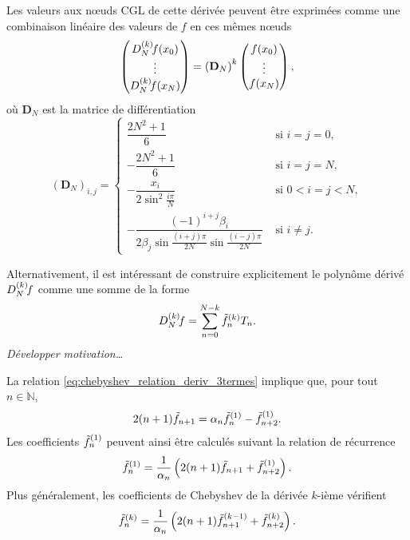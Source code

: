 Les valeurs aux n\oe uds CGL de cette dérivée peuvent être exprimées comme une combinaison linéaire des valeurs de $f$ en ces mêmes n\oe uds
\begin{equation}
	\colvec{ 
		\interpderiv{f}{N}{k}(x_0) \\ 
		\vdots \\
		\interpderiv{f}{N}{k}(x_N)
		}
	=
	{\left( \mathbf{D}_N \right)}^k
	\colvec{ 
		f(x_0) \\ 
		\vdots \\
		f(x_N)
		},
	\label{eq:chebyshev_diff_at_cgl}
\end{equation}
où $\mathbf{D}_N$ est la matrice de différentiation \cite{canuto2006}
\def\cvsp{2.5ex}
\begin{equation}
	\left( \mathbf{D}_N \right)_{i,j} =
	\begin{cases}
	 \dfrac{2N^2 + 1}{6} & \text{\ si\ } i = j = 0,   \\[\cvsp]
	 -\dfrac{2N^2 + 1}{6} & \text{\ si\ } i = j = N,   \\[\cvsp]
	 -\dfrac{x_i}{2 \sin^2 \frac{i \pi}{N}} & \text{\ si\ } 0 < i = j < N, \\[\cvsp]
	 -\dfrac{(-1)^{i+j} \beta_i}{2 \beta_j \sin\frac{(i+j)\pi}{2N} \sin\frac{(i-j)\pi}{2N}} & \text{\ si\ } i \neq j.
	\end{cases}
	\label{eq:chebyshev_diff_matrix}
\end{equation}

Alternativement, il est intéressant de construire explicitement le polynôme dérivé $\interpderiv{f}{N}{k}$ comme une somme de la forme 
\begin{equation}
	\interpderiv{f}{N}{k} = \sum_{n=0}^{N-k} \deriv{\tilde{f}}{k}_n T_n.
\end{equation} 
\textit{Développer motivation\ldots}

\par
La relation \eqref{eq:chebyshev_relation_deriv_3termes} implique que, pour tout $n \in \mathbb{N}$,
\begin{equation}
	2 (n + 1) \tilde{f}_{n+1} = \alpha_n \deriv{\tilde{f}}{1}_n - \deriv{\tilde{f}}{1}_{n+2}.
	\label{eq:chebyshev_prim_recurrence}
\end{equation}
Les coefficients $\deriv{\tilde{f}}{1}_n$ peuvent ainsi être calculés suivant la relation de récurrence
\begin{equation}
	\deriv{\tilde{f}}{1}_n = 
	\frac{1}{\alpha_n} \left( 2 (n + 1) \tilde{f}_{n+1} + \deriv{\tilde{f}}{1}_{n+2} \right).
	\label{eq:chebyshev_diff_recurrence}
\end{equation}
Plus généralement, les coefficients de Chebyshev de la dérivée $k$-ième vérifient
\begin{equation}
	\deriv{\tilde{f}}{k}_n = 
	\frac{1}{\alpha_n} \left( 2 (n + 1) \deriv{\tilde{f}}{k-1}_{n+1} + \deriv{\tilde{f}}{k}_{n+2} \right).
	\label{eq:chebyshev_diffp_recurrence}
\end{equation}

